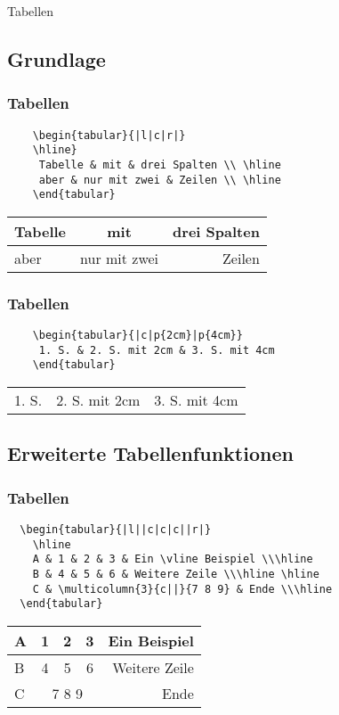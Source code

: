 \begin{frame}
 \begin{center}
  \Huge Tabellen
 \end{center}
\end{frame}

\subsection{Grundlage}
\begin{frame}[fragile]
\frametitle{Tabellen}
  \begin{verbatim}
    \begin{tabular}{|l|c|r|}
    \hline}
     Tabelle & mit & drei Spalten \\ \hline
     aber & nur mit zwei & Zeilen \\ \hline
    \end{tabular}
  \end{verbatim} \pause
  
    \begin{tabular}{|l|c|r|}\hline
      Tabelle & mit & drei Spalten \\\hline
      aber & nur mit zwei & Zeilen \\\hline
    \end{tabular}
\end{frame}

\begin{frame}[fragile]
\frametitle{Tabellen}
  \begin{verbatim}
    \begin{tabular}{|c|p{2cm}|p{4cm}}
     1. S. & 2. S. mit 2cm & 3. S. mit 4cm
    \end{tabular}
  \end{verbatim} \pause
    \begin{tabular}{|c|p{2cm}|p{4cm}}
      1. S. & 2. S. mit 2cm & 3. S. mit 4cm
    \end{tabular}
\end{frame}

\subsection{Erweiterte Tabellenfunktionen}
\begin{frame}[fragile]
\frametitle{Tabellen}
  \begin{verbatim}  
  \begin{tabular}{|l||c|c|c||r|}
    \hline
    A & 1 & 2 & 3 & Ein \vline Beispiel \\\hline
    B & 4 & 5 & 6 & Weitere Zeile \\\hline \hline
    C & \multicolumn{3}{c||}{7 8 9} & Ende \\\hline
  \end{tabular}
  \end{verbatim}
  \begin{tabular}{|l||c|c|c||r|}
    \hline
    A & 1 & 2 & 3 & Ein \vline Beispiel \\\hline
    B & 4 & 5 & 6 & Weitere Zeile \\\hline \hline
    C & \multicolumn{3}{c||}{7 8 9} & Ende \\\hline
  \end{tabular}
\end{frame}

